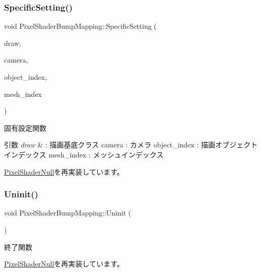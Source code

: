 \subsubsection{\texorpdfstring{Specific\+Setting()}{SpecificSetting()}}
{\footnotesize\ttfamily void Pixel\+Shader\+Bump\+Mapping\+::\+Specific\+Setting (\begin{DoxyParamCaption}\item[{\mbox{\hyperlink{class_draw_base}{Draw\+Base}} $\ast$}]{draw,  }\item[{\mbox{\hyperlink{class_camera}{Camera}} $\ast$}]{camera,  }\item[{unsigned}]{object\+\_\+index,  }\item[{unsigned}]{mesh\+\_\+index }\end{DoxyParamCaption})\hspace{0.3cm}{\ttfamily [virtual]}}



固有設定関数 


\begin{DoxyParams}{引数}
{\em draw} & \+: 描画基底クラス camera \+: カメラ object\+\_\+index \+: 描画オブジェクトインデックス mesh\+\_\+index \+: メッシュインデックス \\
\hline
\end{DoxyParams}


\mbox{\hyperlink{class_pixel_shader_null_a8dd0194b5a22da5261ab35233a7cfdcd}{Pixel\+Shader\+Null}}を再実装しています。

\mbox{\label{class_pixel_shader_bump_mapping_a004f731db6dab6b59949baed4a5a32d7}} 
\subsubsection{\texorpdfstring{Uninit()}{Uninit()}}
{\footnotesize\ttfamily void Pixel\+Shader\+Bump\+Mapping\+::\+Uninit (\begin{DoxyParamCaption}{ }\end{DoxyParamCaption})\hspace{0.3cm}{\ttfamily [virtual]}}



終了関数 



\mbox{\hyperlink{class_pixel_shader_null_ae5ee2fa95e5da787918ccbd1877cd0ef}{Pixel\+Shader\+Null}}を再実装しています。



